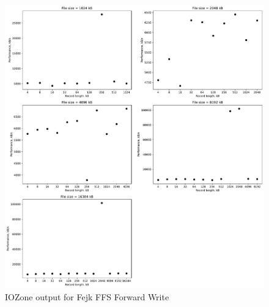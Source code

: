 \begin{figure}[!htb]
	\label{fig:app_benchf_ffs_write}
	\begin{center}
		\includegraphics[width=1.0\textwidth]{figures/benchmarking/fejk-ffs/Write.pdf}
	\end{center}
	\caption{IOZone output for Fejk FFS Forward Write}
\end{figure}

